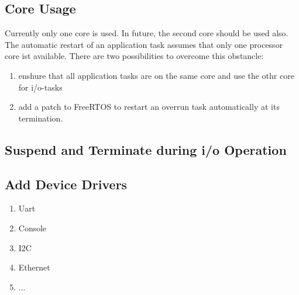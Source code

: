 \subsection{Core Usage}
Currently only one core is used.
In future, the second core should be used also.
The automatic restart of an application task assumes that only one processor core ist 
available.
There are two possibilities to overcome this obstancle:
\begin{enumerate}
\item enshure that all application tasks are on the same core and use the othr core for i/o-tasks
\item add a patch to FreeRTOS to restart an overrun task automatically at its termination.
\end{enumerate}

\subsection{Suspend and Terminate during i/o Operation}

\subsection{Add Device Drivers}
\begin{enumerate}
\item Uart
\item Console
\item I2C
\item Ethernet
\item ...
\end{enumerate}


